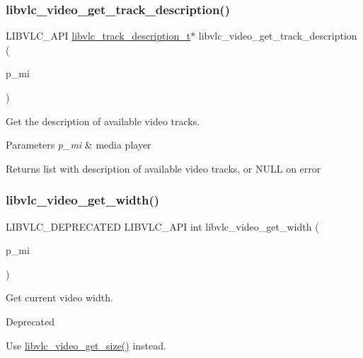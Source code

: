 \subsubsection{\texorpdfstring{libvlc\+\_\+video\+\_\+get\+\_\+track\+\_\+description()}{libvlc\_video\_get\_track\_description()}}
{\footnotesize\ttfamily L\+I\+B\+V\+L\+C\+\_\+\+A\+PI \hyperlink{structlibvlc__track__description__t}{libvlc\+\_\+track\+\_\+description\+\_\+t}$\ast$ libvlc\+\_\+video\+\_\+get\+\_\+track\+\_\+description (\begin{DoxyParamCaption}\item[{libvlc\+\_\+media\+\_\+player\+\_\+t $\ast$}]{p\+\_\+mi }\end{DoxyParamCaption})}

Get the description of available video tracks.


\begin{DoxyParams}{Parameters}
{\em p\+\_\+mi} & media player \\
\hline
\end{DoxyParams}
\begin{DoxyReturn}{Returns}
list with description of available video tracks, or N\+U\+LL on error 
\end{DoxyReturn}
\mbox{\label{group__libvlc__video_gad585bfac7ed2b59f2e84c43e6459a76a}} 
\subsubsection{\texorpdfstring{libvlc\+\_\+video\+\_\+get\+\_\+width()}{libvlc\_video\_get\_width()}}
{\footnotesize\ttfamily L\+I\+B\+V\+L\+C\+\_\+\+D\+E\+P\+R\+E\+C\+A\+T\+ED L\+I\+B\+V\+L\+C\+\_\+\+A\+PI int libvlc\+\_\+video\+\_\+get\+\_\+width (\begin{DoxyParamCaption}\item[{libvlc\+\_\+media\+\_\+player\+\_\+t $\ast$}]{p\+\_\+mi }\end{DoxyParamCaption})}

Get current video width. \begin{DoxyRefDesc}{Deprecated}
\item[\hyperlink{deprecated__deprecated000057}{Deprecated}]Use \hyperlink{group__libvlc__video_ga3cb7efa452da1f718013da0f169396a7}{libvlc\+\_\+video\+\_\+get\+\_\+size()} instead.\end{DoxyRefDesc}



